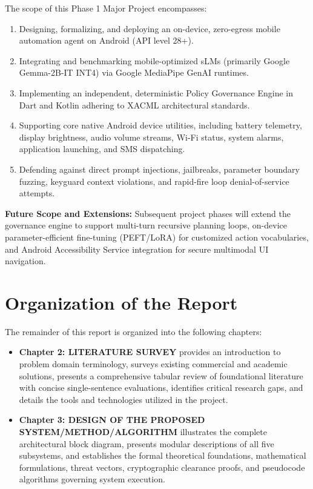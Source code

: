 The scope of this Phase 1 Major Project encompasses:
\begin{enumerate}
    \item Designing, formalizing, and deploying an on-device, zero-egress mobile automation agent on Android (API level 28+).
    \item Integrating and benchmarking mobile-optimized sLMs (primarily Google Gemma-2B-IT INT4) via Google MediaPipe GenAI runtimes.
    \item Implementing an independent, deterministic Policy Governance Engine in Dart and Kotlin adhering to XACML architectural standards.
    \item Supporting core native Android device utilities, including battery telemetry, display brightness, audio volume streams, Wi-Fi status, system alarms, application launching, and SMS dispatching.
    \item Defending against direct prompt injections, jailbreaks, parameter boundary fuzzing, keyguard context violations, and rapid-fire loop denial-of-service attempts.
\end{enumerate}

\noindent\textbf{Future Scope and Extensions:}
Subsequent project phases will extend the governance engine to support multi-turn recursive planning loops, on-device parameter-efficient fine-tuning (PEFT/LoRA) for customized action vocabularies, and Android Accessibility Service integration for secure multimodal UI navigation.

\section{Organization of the Report}

The remainder of this report is organized into the following chapters:
\begin{itemize}
    \item \textbf{Chapter 2: LITERATURE SURVEY} provides an introduction to problem domain terminology, surveys existing commercial and academic solutions, presents a comprehensive tabular review of foundational literature with concise single-sentence evaluations, identifies critical research gaps, and details the tools and technologies utilized in the project.
    \item \textbf{Chapter 3: DESIGN OF THE PROPOSED SYSTEM/METHOD/ALGORITHM} illustrates the complete architectural block diagram, presents modular descriptions of all five subsystems, and establishes the formal theoretical foundations, mathematical formulations, threat vectors, cryptographic clearance proofs, and pseudocode algorithms governing system execution.
\end{itemize}


